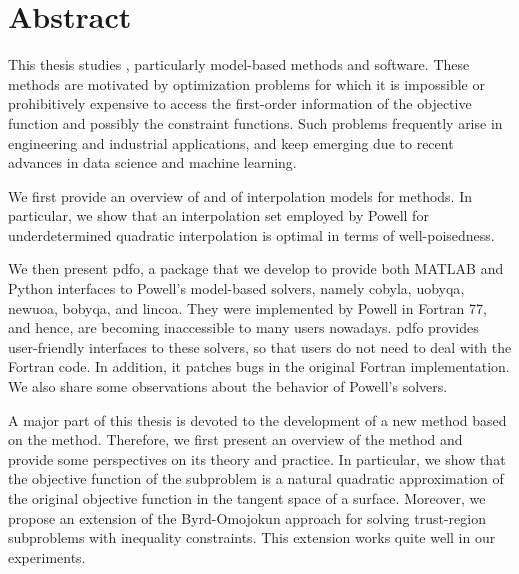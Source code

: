 %
%
%
\chapter*{Abstract}
\label{ch:abstract}

This thesis studies , particularly model-based methods and software.
These methods are motivated by optimization problems for which it is impossible or prohibitively expensive to access the first-order information of the objective function and possibly the constraint functions.
Such problems frequently arise in engineering and industrial applications, and keep emerging due to recent advances in data science and machine learning.

We first provide an overview of  and of interpolation models for  methods.
In particular, we show that an interpolation set employed by Powell for underdetermined quadratic interpolation is optimal in terms of well-poisedness.

We then present \gls{pdfo}, a package that we develop to provide both MATLAB and Python interfaces to Powell's model-based  solvers, namely \gls{cobyla}, \gls{uobyqa}, \gls{newuoa}, \gls{bobyqa}, and \gls{lincoa}.
They were implemented by Powell in Fortran 77, and hence, are becoming inaccessible to many users nowadays.
\Gls{pdfo} provides user-friendly interfaces to these solvers, so that users do not need to deal with the Fortran code.
In addition, it patches bugs in the original Fortran implementation.
We also share some observations about the behavior of Powell's solvers.

A major part of this thesis is devoted to the development of a new  method based on the  method.
Therefore, we first present an overview of the  method and provide some perspectives on its theory and practice.
In particular, we show that the objective function of the  subproblem is a natural quadratic approximation of the original objective function in the tangent space of a surface.
Moreover, we propose an extension of the Byrd-Omojokun approach for solving trust-region  subproblems with inequality constraints.
This extension works quite well in our experiments.

